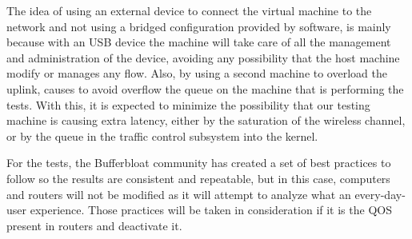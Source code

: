 The idea of using an external device to connect the virtual machine to the 
network and not using a bridged configuration provided by software, is mainly 
because with an USB device the machine will take care of all the management and 
administration of the device, avoiding any possibility that the host machine 
modify or manages any flow. Also, by using a second machine to overload the 
uplink, causes to avoid overflow the queue on the machine that is performing 
the tests. With this, it is expected to minimize the possibility that our 
testing machine is causing extra latency, either by the saturation of the 
wireless channel, or by the queue in the traffic control subsystem into the 
kernel. 

For the tests, the Bufferbloat community\cite{bloat} has created a set of best 
practices\cite{tg12} to follow so the results are consistent and repeatable, 
but in this case, computers and routers will not be modified as it will attempt 
to analyze what an every-day-user experience. Those practices will be taken in 
consideration if it is the QOS present in routers and deactivate it.
 
